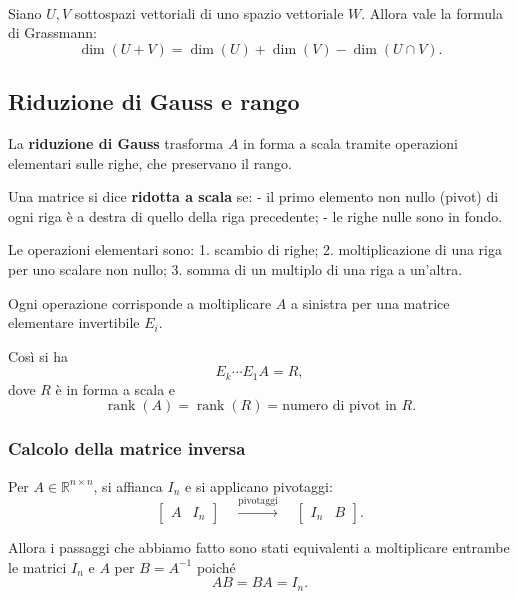 \documentclass[12pt,a4paper]{article}
\begin{document}
\paragraph{} Siano \(U, V\) sottospazi vettoriali di uno spazio vettoriale \(W\). Allora vale la formula di Grassmann:
\[
\dim(U + V) = \dim(U) + \dim(V) - \dim(U \cap V).
\]


\subsection*{Riduzione di Gauss e rango}
La \textbf{riduzione di Gauss} trasforma \( A \) in forma a scala tramite operazioni elementari sulle righe, che preservano il rango.

Una matrice si dice \textbf{ridotta a scala} se:  
- il primo elemento non nullo (pivot) di ogni riga è a destra di quello della riga precedente;  
- le righe nulle sono in fondo.

Le operazioni elementari sono:  
1. scambio di righe;  
2. moltiplicazione di una riga per uno scalare non nullo;  
3. somma di un multiplo di una riga a un'altra.

Ogni operazione corrisponde a moltiplicare \( A \) a sinistra per una matrice elementare invertibile \( E_i \).

Così si ha
\[
E_k \cdots E_1 A = R,
\]
dove \( R \) è in forma a scala e
\[
\operatorname{rank}(A) = \operatorname{rank}(R) = \text{numero di pivot in } R.
\]

\subsubsection*{Calcolo della matrice inversa}
Per \( A \in \mathbb{R}^{n \times n} \), si affianca \( I_n \) e si applicano pivotaggi:
\[
\left[
\begin{array}{c|c}
A & I_n
\end{array}
\right]
\quad \xrightarrow{\text{pivotaggi}} \quad
\left[
\begin{array}{c|c}
I_n & B
\end{array}
\right].
\]

Allora i passaggi che abbiamo fatto sono stati equivalenti a moltiplicare entrambe le matrici $I_n$ e $A$ per \( B = A^{-1} \) poiché
\[
AB = BA = I_n.
\]
\end{document}
